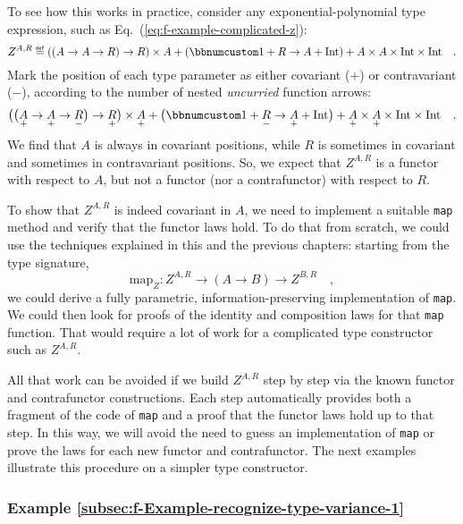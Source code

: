 To see how this works in practice, consider any exponential-polynomial
type expression, such as Eq.~(\ref{eq:f-example-complicated-z}):
\[
Z^{A,R}\triangleq\left(\left(A\rightarrow A\rightarrow R\right)\rightarrow R\right)\times A+\left(\bbnum 1+R\rightarrow A+\text{Int}\right)+A\times A\times\text{Int}\times\text{Int}\quad.
\]
Mark the position of each type parameter as either covariant ($+$)
or contravariant ($-$), according to the number of nested \emph{uncurried}
function arrows:
\[
\big(\big(\underset{+}{A}\rightarrow\underset{+}{A}\rightarrow\underset{-}{R}\big)\rightarrow\underset{+}{R}\big)\times\underset{+}{A}+\big(\bbnum 1+\underset{-}{R}\rightarrow\underset{+}{A}+\text{Int}\big)+\underset{+}{A}\times\underset{+}{A}\times\text{Int}\times\text{Int}\quad.
\]
We find that $A$ is always in covariant positions, while $R$ is
sometimes in covariant and sometimes in contravariant positions. So,
we expect that $Z^{A,R}$ is a functor with respect to $A$, but not
a functor (nor a contrafunctor) with respect to $R$.

To show that $Z^{A,R}$ is indeed covariant in $A$, we need to implement
a suitable \lstinline!map! method and verify that the functor laws
hold. To do that from scratch, we could use the techniques explained
in this and the previous chapters: starting from the type signature,
\[
\text{map}_{Z}:Z^{A,R}\rightarrow\left(A\rightarrow B\right)\rightarrow Z^{B,R}\quad,
\]
we could derive a fully parametric, information-preserving implementation
of \lstinline!map!. We could then look for proofs of the identity
and composition laws for that \lstinline!map! function. That would
require a lot of work for a complicated type constructor such as $Z^{A,R}$.

All that work can be avoided if we build $Z^{A,R}$ step by step via
the known functor and contrafunctor constructions. Each step automatically
provides both a fragment of the code of \lstinline!map! and a proof
that the functor laws hold up to that step. In this way, we will avoid
the need to guess an implementation of \lstinline!map! or prove the
laws for each new functor and contrafunctor. The next examples illustrate
this procedure on a simpler type constructor.

\subsubsection{Example \label{subsec:f-Example-recognize-type-variance-1}\ref{subsec:f-Example-recognize-type-variance-1}}

